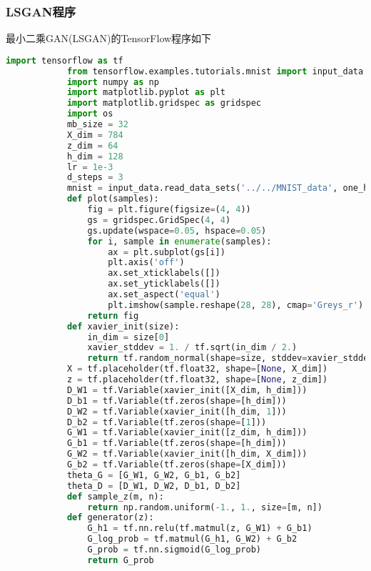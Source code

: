         \subsubsection{LSGAN程序}
            \par
            最小二乘GAN(LSGAN)的TensorFlow程序如下
            \begin{lstlisting}[language = Python]
            import tensorflow as tf
            from tensorflow.examples.tutorials.mnist import input_data
            import numpy as np
            import matplotlib.pyplot as plt
            import matplotlib.gridspec as gridspec
            import os
            mb_size = 32
            X_dim = 784
            z_dim = 64
            h_dim = 128
            lr = 1e-3
            d_steps = 3
            mnist = input_data.read_data_sets('../../MNIST_data', one_hot=True)
            def plot(samples):
                fig = plt.figure(figsize=(4, 4))
                gs = gridspec.GridSpec(4, 4)
                gs.update(wspace=0.05, hspace=0.05)
                for i, sample in enumerate(samples):
                    ax = plt.subplot(gs[i])
                    plt.axis('off')
                    ax.set_xticklabels([])
                    ax.set_yticklabels([])
                    ax.set_aspect('equal')
                    plt.imshow(sample.reshape(28, 28), cmap='Greys_r')
                return fig
            def xavier_init(size):
                in_dim = size[0]
                xavier_stddev = 1. / tf.sqrt(in_dim / 2.)
                return tf.random_normal(shape=size, stddev=xavier_stddev)
            X = tf.placeholder(tf.float32, shape=[None, X_dim])
            z = tf.placeholder(tf.float32, shape=[None, z_dim])
            D_W1 = tf.Variable(xavier_init([X_dim, h_dim]))
            D_b1 = tf.Variable(tf.zeros(shape=[h_dim]))
            D_W2 = tf.Variable(xavier_init([h_dim, 1]))
            D_b2 = tf.Variable(tf.zeros(shape=[1]))
            G_W1 = tf.Variable(xavier_init([z_dim, h_dim]))
            G_b1 = tf.Variable(tf.zeros(shape=[h_dim]))
            G_W2 = tf.Variable(xavier_init([h_dim, X_dim]))
            G_b2 = tf.Variable(tf.zeros(shape=[X_dim]))
            theta_G = [G_W1, G_W2, G_b1, G_b2]
            theta_D = [D_W1, D_W2, D_b1, D_b2]
            def sample_z(m, n):
                return np.random.uniform(-1., 1., size=[m, n])
            def generator(z):
                G_h1 = tf.nn.relu(tf.matmul(z, G_W1) + G_b1)
                G_log_prob = tf.matmul(G_h1, G_W2) + G_b2
                G_prob = tf.nn.sigmoid(G_log_prob)
                return G_prob

\end{lstlisting}
